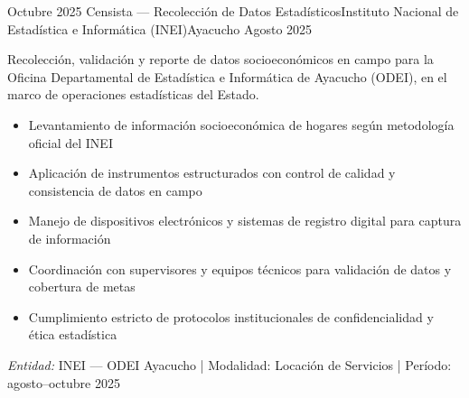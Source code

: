 \experience
{Octubre 2025} {Censista — Recolección de Datos Estadísticos}{Instituto Nacional de Estadística e Informática (INEI)}{Ayacucho}
{Agosto 2025} {
	Recolección, validación y reporte de datos socioeconómicos en campo para la Oficina Departamental de Estadística e Informática de Ayacucho (ODEI), en el marco de operaciones estadísticas del Estado.
	\begin{itemize}
		\item Levantamiento de información socioeconómica de hogares según metodología oficial del INEI
		\item Aplicación de instrumentos estructurados con control de calidad y consistencia de datos en campo
		\item Manejo de dispositivos electrónicos y sistemas de registro digital para captura de información
		\item Coordinación con supervisores y equipos técnicos para validación de datos y cobertura de metas
		\item Cumplimiento estricto de protocolos institucionales de confidencialidad y ética estadística
	\end{itemize}
}
{\footnotesize{\emph{Entidad:} INEI — ODEI Ayacucho | Modalidad: Locación de Servicios | Período: agosto–octubre 2025}}
